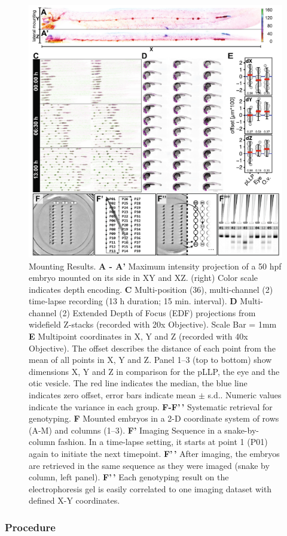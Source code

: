 \documentclass[10pt, b5paper, singlespacinge, twoside]{reedthesis} %
\theoremstyle{definition}
\theoremstyle{definition}
\theoremstyle{definition}
\theoremstyle{remark}
\begin{document}
\begin{figure}

{\centering \includegraphics[width=0.95\linewidth]{figures/results/00_methods/mounting/stamp_results} 

}

\caption[Mounting results]{Mounting Results. \textbf{A - A'} Maximum intensity projection of a 50 hpf embryo mounted on its side in XY and XZ. (right) Color scale indicates depth encoding. \textbf{C} Multi-position (36), multi-channel (2) time-lapse recording (13 h duration; 15 min. interval). \textbf{D} Multi-channel (2) Extended Depth of Focus (EDF) projections from widefield Z-stacks (recorded with 20x Objective). Scale Bar = 1mm \textbf{E} Multipoint coordinates in X, Y and Z (recorded with 40x Objective). The offset describes the distance of each point from the mean of all points in X, Y and Z. Panel 1--3 (top to bottom) show dimensions X, Y and Z in comparison for the pLLP, the eye and the otic vesicle. The red line indicates the median, the blue line indicates zero offset, error bars indicate mean \(\pm\) s.d.. Numeric values indicate the variance in each group. \textbf{F-F'\,'} Systematic retrieval for genotyping. \textbf{F} Mounted embryos in a 2-D coordinate system of rows (A-M) and columns (1--3). \textbf{F'} Imaging Sequence in a snake-by-column fashion. In a time-lapse setting, it starts at point 1 (P01) again to initiate the next timepoint. \textbf{F'\,'} After imaging, the embryos are retrieved in the same sequence as they were imaged (snake by column, left panel). \textbf{F'\,'} Each genotyping result on the electrophoresis gel is easily correlated to one imaging dataset with defined X-Y coordinates.}\label{fig:stampresults}
\end{figure}
\hypertarget{procedure}{%
\subsubsection{Procedure}\label{procedure}}
\end{document}

